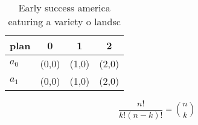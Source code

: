 \documentclass[a4paper]{article}
\begin{document}
\begin{table}
\begin{adjustbox}{width=0.6\columnwidth}
\begin{tabular}{|l|l|l|l|}
\hline
\textbf{plan} & \multicolumn{1}{c|}{\textbf{0}} & \multicolumn{1}{c|}{\textbf{1}} & \multicolumn{1}{c|}{\textbf{2}} \\ \hline
\textbf{$a_0$}  & (0,0) & (1,0) & (2,0) \\ \hline
\textbf{$a_1$}  & (0,0) & (1,0) & (2,0) \\ \hline
\end{tabular}
\end{adjustbox}
\caption{Early success america eaturing a variety o landsc
}
\end{table}

\[ \frac{n!}{k!(n-k)!} = \binom{n}{k} \]
\end{document}
